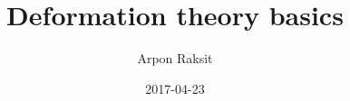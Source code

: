 


\title{Deformation theory basics}
\author{Arpon Raksit}
\date{2017-04-23}



\maketitle









